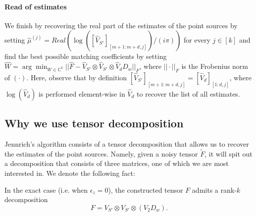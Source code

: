 \paragraph{Read of estimates} We finish by recovering the real part of the estimates of the point sources by setting $\widehat{\mu}^{(j)}=Real(\log([\widehat{V}_{S'}]_{[m+1:m+d,j]})/(i\pi))$ for every $j\in[k]$ and find the best possible matching coefficients by setting $\widehat{W}=\arg\min_{W\in\mathbb{C}^k}||\widehat{F}-\widehat{V}_{S'}\otimes\widehat{V}_{S'}\otimes \widehat{V}_dD_w||_F$, where $||\cdot||_F$ is the Frobenius norm of $(\cdot)$. Here, observe that by definition $[\widehat{V}_{S'}]_{[m+1:m+d,j]}=[\widehat{V}_d]_{[1:d,j]}$, where $\log(\widehat{V}_d)$ is performed element-wise in $\widehat{V}_d$ to recover the list of all estimates.
\subsection{Why we use tensor decomposition}
Jennrich's algorithm consists of a tensor decomposition that allows us to recover the estimates of the point sources. Namely, given a noisy tensor $\tilde{F}$, it will spit out a decomposition that consists of three matrices, one of which we are most interested in. We denote the following fact:
\begin{fact}
    In the exact case (i.e. when $\epsilon_z=0$), the constructed tensor $F$ admits a rank-$k$ decomposition $$F=V_{S'}\otimes V_{S'}\otimes (V_2D_w).$$
\end{fact}

